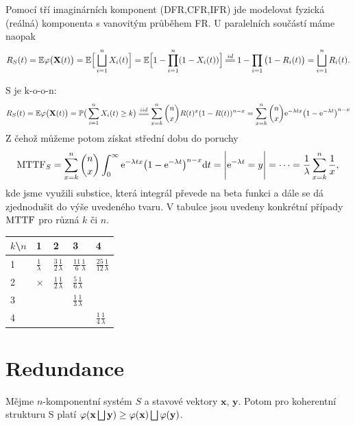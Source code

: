     \begin{example}
        Pomocí tří imaginárních komponent (DFR,CFR,IFR) jde modelovat fyzická (reálná) komponenta s vanovitým průběhem FR. U paralelních součástí máme naopak 
        $$ R_S(t)=\E\crossedphi\big(\textbf{X}(t)\big)=\E\Big[\bigsqcup_{i=1}^n X_i(t)\Big]=\E\Big[1-\prod_{i=1}^n(1-X_i(t))\Big]\equal{id}1-\prod_{i=1}\big(1-R_i(t)\big)=\bigsqcup_{i=1}^n R_i(t). $$
    \end{example}

    \begin{example}
    S je k-o-o-n: 
    $$ R_S(t)=\E\crossedphi\big(\textbf{X}(t)\big)= \PP\big(\sum_{i=1}^n X_i(t)\geq k\big)\equal{iid}\sum_{x=k}^n {n\choose x} R(t)^{x} (1-R(t))^{n-x} = \sum_{x=k}^n {n\choose x} \e{-\lambda tx} \big(1-\e{-\lambda t}\big)^{n-x}   $$
    Z čehož můžeme potom získat střední dobu do poruchy
    $$\mathrm{MTTF}_S = \sum_{x=k}^n {n\choose x} \int_0^\infty \mathrm{e}^{-\lambda tx} \big(1-\mathrm{e}^{-\lambda t}\big)^{n-x} \mathrm{d} t = \Bigg| \mathrm{e}^{-\lambda t} = y \Bigg| = \dots =  \frac{1}{\lambda} \sum_{x=k}^n \frac{1}{x},$$
    kde jsme využili substice, která integrál převede na beta funkci a dále se dá zjednodušit do výše uvedeného tvaru. V tabulce jsou uvedeny konkrétní případy $\mathrm{MTTF}$ pro různá $k$ či $n$.

    \begin{table}[h]
        \centering
        \begin{tabular}{|l|l|l|l|l|}
            \hline
            $k$\textbackslash $n$& 1 & 2 &3  & 4 \\ \hline\hline
            1&$\frac{1}{\lambda}$  &  $\frac{3}{2}$$\frac{1}{\lambda}$& $\frac{11}{6}$$\frac{1}{\lambda}$ & $\frac{25}{12}$$\frac{1}{\lambda}$ \\ \hline
            2& $\times$ & $\frac{1}{2}$$\frac{1}{\lambda}$ & $\frac{5}{6}$$\frac{1}{\lambda}$ &  \\ \hline
            3&  &  & $\frac{1}{3}$$\frac{1}{\lambda}$ &  \\ \hline
            4&  &  &  & $\frac{1}{4}$$\frac{1}{\lambda}$ \\ \hline
        \end{tabular}
    \end{table}
    \end{example}

\section{Redundance}

    \begin{theorem}
        Mějme $n$-komponentní systém $S$ a stavové vektory $\textbf{x}$, $\textbf{y}$. Potom pro koherentní strukturu S platí $\crossedphi(\textbf{x} \bigsqcup \textbf{y}) \geq  \crossedphi(\textbf{x}) \bigsqcup \crossedphi(\textbf{y})$.
    \end{theorem}

